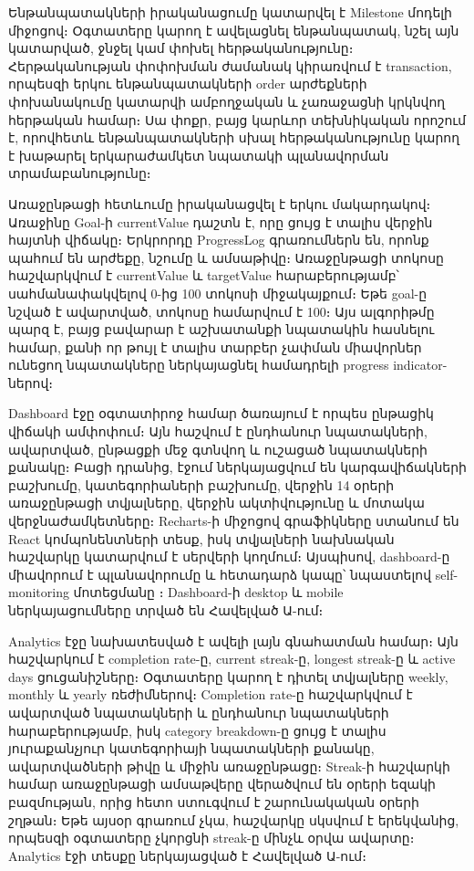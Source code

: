 Ենթանպատակների իրականացումը կատարվել է Milestone մոդելի միջոցով։ Օգտատերը կարող է ավելացնել ենթանպատակ, նշել այն կատարված, ջնջել կամ փոխել հերթականությունը։ Հերթականության փոփոխման ժամանակ կիրառվում է transaction, որպեսզի երկու ենթանպատակների order արժեքների փոխանակումը կատարվի ամբողջական և չառաջացնի կրկնվող հերթական համար։ Սա փոքր, բայց կարևոր տեխնիկական որոշում է, որովհետև ենթանպատակների սխալ հերթականությունը կարող է խաթարել երկարաժամկետ նպատակի պլանավորման տրամաբանությունը։

Առաջընթացի հետևումը իրականացվել է երկու մակարդակով։ Առաջինը Goal-ի currentValue դաշտն է, որը ցույց է տալիս վերջին հայտնի վիճակը։ Երկրորդը ProgressLog գրառումներն են, որոնք պահում են արժեքը, նշումը և ամսաթիվը։ Առաջընթացի տոկոսը հաշվարկվում է currentValue և targetValue հարաբերությամբ՝ սահմանափակվելով 0-ից 100 տոկոսի միջակայքում։ Եթե goal-ը նշված է ավարտված, տոկոսը համարվում է 100։ Այս ալգորիթմը պարզ է, բայց բավարար է աշխատանքի նպատակին հասնելու համար, քանի որ թույլ է տալիս տարբեր չափման միավորներ ունեցող նպատակները ներկայացնել համադրելի progress indicator-ներով։

Dashboard էջը օգտատիրոջ համար ծառայում է որպես ընթացիկ վիճակի ամփոփում։ Այն հաշվում է ընդհանուր նպատակների, ավարտված, ընթացքի մեջ գտնվող և ուշացած նպատակների քանակը։ Բացի դրանից, էջում ներկայացվում են կարգավիճակների բաշխումը, կատեգորիաների բաշխումը, վերջին 14 օրերի առաջընթացի տվյալները, վերջին ակտիվությունը և մոտակա վերջնաժամկետները։ Recharts-ի միջոցով գրաֆիկները ստանում են React կոմպոնենտների տեսք, իսկ տվյալների նախնական հաշվարկը կատարվում է սերվերի կողմում։ Այսպիսով, dashboard-ը միավորում է պլանավորումը և հետադարձ կապը՝ նպաստելով self-monitoring մոտեցմանը \autocite{bctEngagement2023}։ Dashboard-ի desktop և mobile ներկայացումները տրված են Հավելված Ա-ում։

Analytics էջը նախատեսված է ավելի լայն գնահատման համար։ Այն հաշվարկում է completion rate-ը, current streak-ը, longest streak-ը և active days ցուցանիշները։ Օգտատերը կարող է դիտել տվյալները weekly, monthly և yearly ռեժիմներով։ Completion rate-ը հաշվարկվում է ավարտված նպատակների և ընդհանուր նպատակների հարաբերությամբ, իսկ category breakdown-ը ցույց է տալիս յուրաքանչյուր կատեգորիայի նպատակների քանակը, ավարտվածների թիվը և միջին առաջընթացը։ Streak-ի հաշվարկի համար առաջընթացի ամսաթվերը վերածվում են օրերի եզակի բազմության, որից հետո ստուգվում է շարունակական օրերի շղթան։ Եթե այսօր գրառում չկա, հաշվարկը սկսվում է երեկվանից, որպեսզի օգտատերը չկորցնի streak-ը մինչև օրվա ավարտը։ Analytics էջի տեսքը ներկայացված է Հավելված Ա-ում։

